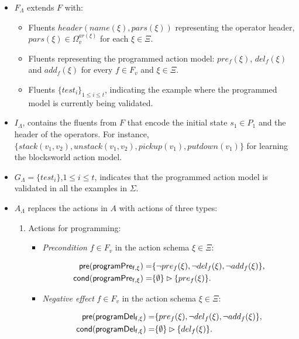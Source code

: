\documentclass[letterpaper]{article} %
\newcommand{\pre}{\mathsf{pre}}     %
\newcommand{\cond}{\mathsf{cond}}   %
\begin{document}
\begin{itemize}
\item $F_{\Lambda}$ extends $F$ with:
\begin{itemize}
\item Fluents $header(name(\xi),pars(\xi))$ representing the operator header, $pars(\xi)\in\Omega_v^{ar(\xi)}$ for each $\xi \in \Xi$. 
\item Fluents representing the programmed action model: $pre_f(\xi)$, $del_f(\xi)$ and $add_f(\xi)$ for every $f\in F_v$ and $\xi \in \Xi$.
\item Fluents $\{test_i\}_{1\leq i\leq t}$, indicating the example where the programmed model is currently being validated.
\end{itemize}
\item $I_{\Lambda}$, contains the fluents from $F$ that encode the initial state $s_1\in P_1$ and the header of the operators. For instance, {\small $\{stack(v_1,v_2), unstack(v_1,v_2), pickup(v_1), putdown(v_1)\}$} for learning the blocksworld action model.
\item $G_{\Lambda}=\{test_i\}$,{\small $1\leq i\leq t$}, indicates that the programmed action model is validated in all the examples in $\Sigma$.
\item $A_{\Lambda}$ replaces the actions in $A$ with actions of three types:
\begin{enumerate}
\item Actions for programming:

\begin{itemize}
\item {\em Precondition} $f\in F_v$ in the action schema $\xi\in\Xi$:
\begin{small}
\begin{align*}
\hspace*{7pt}\pre(\mathsf{programPre_{f,\xi}})=&\{\neg pre_{f}(\xi),\neg del_{f}(\xi),\neg add_{f}(\xi)\},\\    
\cond(\mathsf{programPre_{f,\xi}})=&\{\emptyset\}\rhd\{pre_{f}(\xi)\}.
\end{align*}
\end{small}

\item {\em Negative effect} $f\in F_v$ in the action schema $\xi\in\Xi$:
\begin{small}
\begin{align*}
\hspace*{7pt}\pre(\mathsf{programDel_{f,\xi}})=&\{pre_{f}(\xi),\neg del_{f}(\xi),\neg add_{f}(\xi)\},\\                                                   
\cond(\mathsf{programDel_{f,\xi}})=&\{\emptyset\}\rhd\{del_{f}(\xi)\}.
\end{align*}
\end{small}


\end{itemize}
\end{enumerate}
\end{itemize}
\end{document}
